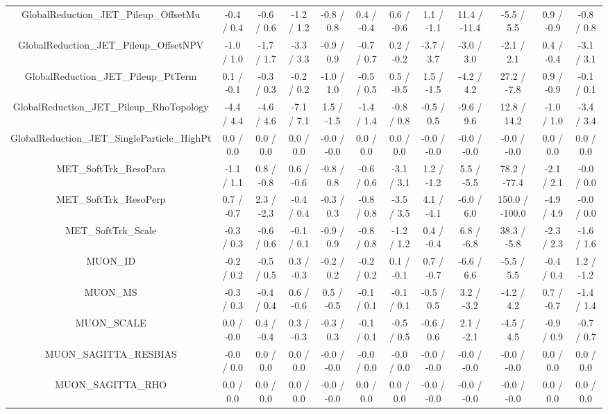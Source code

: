 \begin{table}[htbp]
\begin{center}
\begin{tabular}{|c|c|c|c|c|c|c|c|c|c|c|c|}
  GlobalReduction_JET_Pileup_OffsetMu & -0.4 / 0.4 & -0.6 / 0.6 & -1.2 / 1.2 & -0.8 / 0.8 & 0.4 / -0.4 & 0.6 / -0.6 & 1.1 / -1.1 & 11.4 / -11.4 & -5.5 / 5.5 & 0.9 / -0.9 & -0.8 / 0.8 \\ 
  GlobalReduction_JET_Pileup_OffsetNPV & -1.0 / 1.0 & -1.7 / 1.7 & -3.3 / 3.3 & -0.9 / 0.9 & -0.7 / 0.7 & 0.2 / -0.2 & -3.7 / 3.7 & -3.0 / 3.0 & -2.1 / 2.1 & 0.4 / -0.4 & -3.1 / 3.1 \\ 
  GlobalReduction_JET_Pileup_PtTerm & 0.1 / -0.1 & -0.3 / 0.3 & -0.2 / 0.2 & -1.0 / 1.0 & -0.5 / 0.5 & 0.5 / -0.5 & 1.5 / -1.5 & -4.2 / 4.2 & 27.2 / -7.8 & 0.9 / -0.9 & -0.1 / 0.1 \\ 
  GlobalReduction_JET_Pileup_RhoTopology & -4.4 / 4.4 & -4.6 / 4.6 & -7.1 / 7.1 & 1.5 / -1.5 & -1.4 / 1.4 & -0.8 / 0.8 & -0.5 / 0.5 & -9.6 / 9.6 & 12.8 / 14.2 & -1.0 / 1.0 & -3.4 / 3.4 \\ 
  GlobalReduction_JET_SingleParticle_HighPt & 0.0 / 0.0 & 0.0 / 0.0 & 0.0 / 0.0 & -0.0 / -0.0 & 0.0 / 0.0 & 0.0 / 0.0 & -0.0 / -0.0 & -0.0 / -0.0 & -0.0 / -0.0 & 0.0 / 0.0 & 0.0 / 0.0 \\ 
  MET_SoftTrk_ResoPara & -1.1 / 1.1 & 0.8 / -0.8 & 0.6 / -0.6 & -0.8 / 0.8 & -0.6 / 0.6 & -3.1 / 3.1 & 1.2 / -1.2 & 5.5 / -5.5 & 78.2 / -77.4 & -2.1 / 2.1 & -0.0 / 0.0 \\ 
  MET_SoftTrk_ResoPerp & 0.7 / -0.7 & 2.3 / -2.3 & -0.4 / 0.4 & -0.3 / 0.3 & -0.8 / 0.8 & -3.5 / 3.5 & 4.1 / -4.1 & -6.0 / 6.0 & 150.0 / -100.0 & -4.9 / 4.9 & -0.0 / 0.0 \\ 
  MET_SoftTrk_Scale & -0.3 / 0.3 & -0.6 / 0.6 & -0.1 / 0.1 & -0.9 / 0.9 & -0.8 / 0.8 & -1.2 / 1.2 & 0.4 / -0.4 & 6.8 / -6.8 & 38.3 / -5.8 & -2.3 / 2.3 & -1.6 / 1.6 \\ 
  MUON_ID & -0.2 / 0.2 & -0.5 / 0.5 & 0.3 / -0.3 & -0.2 / 0.2 & -0.2 / 0.2 & 0.1 / -0.1 & 0.7 / -0.7 & -6.6 / 6.6 & -5.5 / 5.5 & -0.4 / 0.4 & 1.2 / -1.2 \\ 
  MUON_MS & -0.3 / 0.3 & -0.4 / 0.4 & 0.6 / -0.6 & 0.5 / -0.5 & -0.1 / 0.1 & -0.1 / 0.1 & -0.5 / 0.5 & 3.2 / -3.2 & -4.2 / 4.2 & 0.7 / -0.7 & -1.4 / 1.4 \\ 
  MUON_SCALE & 0.0 / -0.0 & 0.4 / -0.4 & 0.3 / -0.3 & -0.3 / 0.3 & -0.1 / 0.1 & -0.5 / 0.5 & -0.6 / 0.6 & 2.1 / -2.1 & -4.5 / 4.5 & -0.9 / 0.9 & -0.7 / 0.7 \\ 
  MUON_SAGITTA_RESBIAS & -0.0 / 0.0 & 0.0 / 0.0 & 0.0 / 0.0 & -0.0 / -0.0 & -0.0 / 0.0 & -0.0 / 0.0 & -0.0 / -0.0 & -0.0 / -0.0 & -0.0 / -0.0 & 0.0 / 0.0 & 0.0 / 0.0 \\ 
  MUON_SAGITTA_RHO & 0.0 / 0.0 & 0.0 / 0.0 & 0.0 / 0.0 & -0.0 / -0.0 & 0.0 / 0.0 & 0.0 / 0.0 & -0.0 / -0.0 & -0.0 / -0.0 & -0.0 / -0.0 & 0.0 / 0.0 & 0.0 / 0.0 \\ 

\end{tabular}
\end{center}
\end{table}
